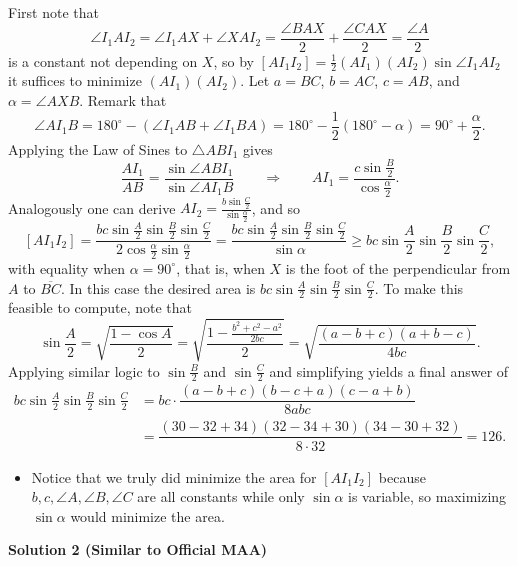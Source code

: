 \begin{enumerate}
First note that 
 \[\angle I_1AI_2 = \angle I_1AX + \angle XAI_2 = \frac{\angle BAX}2 + \frac{\angle CAX}2 = \frac{\angle A}2\] is a constant not depending on $X$, so by $[AI_1I_2] = \frac12(AI_1)(AI_2)\sin\angle I_1AI_2$ it suffices to minimize $(AI_1)(AI_2)$.  Let $a = BC$, $b = AC$, $c = AB$, and $\alpha = \angle AXB$.  Remark that 
 \[\angle AI_1B = 180^\circ - (\angle I_1AB + \angle I_1BA) = 180^\circ - \frac12(180^\circ - \alpha) = 90^\circ + \frac\alpha 2.\] Applying the Law of Sines to $\triangle ABI_1$ gives 
 \[\frac{AI_1}{AB} = \frac{\sin\angle ABI_1}{\sin\angle AI_1B}\qquad\Rightarrow\qquad AI_1 = \frac{c\sin\frac B2}{\cos\frac\alpha 2}.\] Analogously one can derive $AI_2 = \frac{b\sin\frac C2}{\sin\frac\alpha 2}$, and so 
 \[[AI_1I_2] = \frac{bc\sin\frac A2 \sin\frac B2\sin\frac C2}{2\cos\frac\alpha 2\sin\frac\alpha 2} = \frac{bc\sin\frac A2 \sin\frac B2\sin\frac C2}{\sin\alpha}\geq bc\sin\frac A2 \sin\frac B2\sin\frac C2,\] with equality when $\alpha = 90^\circ$, that is, when $X$ is the foot of the perpendicular from $A$ to $\overline{BC}$.  In this case the desired area is $bc\sin\frac A2\sin\frac B2\sin\frac C2$.  To make this feasible to compute, note that 
 \[\sin\frac A2=\sqrt{\frac{1-\cos A}2}=\sqrt{\frac{1-\frac{b^2+c^2-a^2}{2bc}}2} = \sqrt{\dfrac{(a-b+c)(a+b-c)}{4bc}}.\] Applying similar logic to $\sin \frac B2$ and $\sin\frac C2$ and simplifying yields a final answer of 
 \begin{align*}bc\sin\frac A2\sin\frac B2\sin\frac C2&=bc\cdot\dfrac{(a-b+c)(b-c+a)(c-a+b)}{8abc}\\&=\dfrac{(30-32+34)(32-34+30)(34-30+32)}{8\cdot 32}=\boxed{126}.\end{align*}


            \begin{itemize}
        \item Notice that we truly did minimize the area for $[A I_1 I_2]$ because $b, c, \angle A, \angle B, \angle C$ are all constants while only $\sin \alpha$ is variable, so maximizing $\sin \alpha$ would minimize the area.
            \end{itemize}
            



\textbf{Solution 2 (Similar to Official MAA)}


\end{enumerate}
